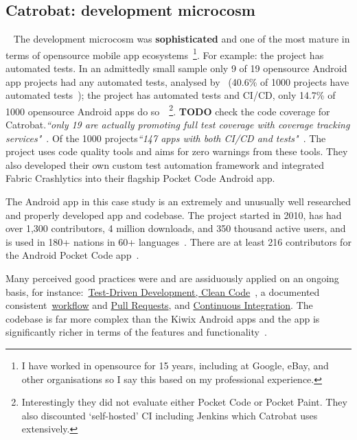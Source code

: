 \subsection{Catrobat: development microcosm}~\label{catrobat-development-microcosm}
The development microcosm was \textbf{sophisticated} and one of the most mature in terms of opensource mobile app ecosystems~\footnote{I have worked in opensource for 15 years, including at Google, eBay, and other organisations so I say this based on my professional experience.}. For example: the project has automated tests. In an admittedly small sample only 9 of 19 opensource Android app projects had any automated tests, analysed by~\citet{silva2016_an_analysis_of_automated_tests_for_mobile_android_apps} (40.6\% of 1000 projects have automated tests~\citep[p. ]{cruz2019_guess_what_test_your_app}); the project has automated tests and CI/CD, only 14.7\% of 1000 opensource Android apps do so~\citep[p. ]{cruz2019_guess_what_test_your_app}~\footnote{Interestingly they did not evaluate either Pocket Code or Pocket Paint. They also discounted `self-hosted' CI including Jenkins which Catrobat uses extensively.}.  \textbf{TODO} check the code coverage for Catrobat.\emph{``only 19 are actually promoting full test coverage with coverage tracking services"}~\citep[p. ]{cruz2019_guess_what_test_your_app}. Of the 1000 projects\emph{``147 apps with both CI/CD and tests"}~\citep[p. ]{cruz2019_guess_what_test_your_app}. The project uses code quality tools and aims for zero warnings from these tools. They also developed their own custom test automation framework and integrated Fabric Crashlytics into their flagship Pocket Code Android app.


The Android app in this case study is an extremely and unusually well researched and properly developed app and codebase. The project started in 2010, has had over 1,300 contributors, 4 million downloads, and 350 thousand active users, and is used in 180+ nations in 60+ languages~\citep{catrobat_project}. There are at least 216 contributors for the Android Pocket Code app~\citep{github_catroid}.

Many perceived good practices were and are assiduously applied on an ongoing basis, for instance:~\href{https://github.com/Catrobat/Catroid}{Test-Driven Development, Clean Code}~\citep{catrobat_first_steps_into}, a documented consistent~\href{https://github.com/Catrobat/Catroid/wiki/Workflow}{workflow} and \href{https://github.com/Catrobat/Catroid/wiki/Creating-a-pull-request}{Pull Requests}, and \href{https://jenkins.catrob.at/job/Catroid/}{Continuous Integration}. The codebase is far more complex than the Kiwix Android apps and the app is significantly richer in terms of the features and functionality~\citep{mueller2019_pocketcode}.

